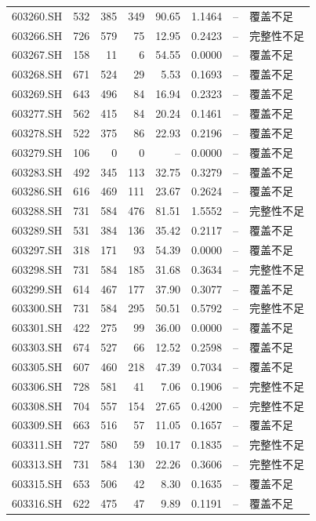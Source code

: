 \documentclass[10pt,a4paper]{article}
\begin{document}
\begin{longtable}{lrrr r r r l}
603260.SH & 532 & 385 & 349 & 90.65 & 1.1464 & -- & 覆盖不足\\
603266.SH & 726 & 579 & 75 & 12.95 & 0.2423 & -- & 完整性不足\\
603267.SH & 158 & 11 & 6 & 54.55 & 0.0000 & -- & 覆盖不足\\
603268.SH & 671 & 524 & 29 & 5.53 & 0.1693 & -- & 覆盖不足\\
603269.SH & 643 & 496 & 84 & 16.94 & 0.2323 & -- & 覆盖不足\\
603277.SH & 562 & 415 & 84 & 20.24 & 0.1461 & -- & 覆盖不足\\
603278.SH & 522 & 375 & 86 & 22.93 & 0.2196 & -- & 覆盖不足\\
603279.SH & 106 & 0 & 0 & -- & 0.0000 & -- & 覆盖不足\\
603283.SH & 492 & 345 & 113 & 32.75 & 0.3279 & -- & 覆盖不足\\
603286.SH & 616 & 469 & 111 & 23.67 & 0.2624 & -- & 覆盖不足\\
603288.SH & 731 & 584 & 476 & 81.51 & 1.5552 & -- & 完整性不足\\
603289.SH & 531 & 384 & 136 & 35.42 & 0.2117 & -- & 覆盖不足\\
603297.SH & 318 & 171 & 93 & 54.39 & 0.0000 & -- & 覆盖不足\\
603298.SH & 731 & 584 & 185 & 31.68 & 0.3634 & -- & 完整性不足\\
603299.SH & 614 & 467 & 177 & 37.90 & 0.3077 & -- & 覆盖不足\\
603300.SH & 731 & 584 & 295 & 50.51 & 0.5792 & -- & 完整性不足\\
603301.SH & 422 & 275 & 99 & 36.00 & 0.0000 & -- & 覆盖不足\\
603303.SH & 674 & 527 & 66 & 12.52 & 0.2598 & -- & 覆盖不足\\
603305.SH & 607 & 460 & 218 & 47.39 & 0.7034 & -- & 覆盖不足\\
603306.SH & 728 & 581 & 41 & 7.06 & 0.1906 & -- & 完整性不足\\
603308.SH & 704 & 557 & 154 & 27.65 & 0.4200 & -- & 完整性不足\\
603309.SH & 663 & 516 & 57 & 11.05 & 0.1657 & -- & 覆盖不足\\
603311.SH & 727 & 580 & 59 & 10.17 & 0.1835 & -- & 完整性不足\\
603313.SH & 731 & 584 & 130 & 22.26 & 0.3606 & -- & 完整性不足\\
603315.SH & 653 & 506 & 42 & 8.30 & 0.1635 & -- & 覆盖不足\\
603316.SH & 622 & 475 & 47 & 9.89 & 0.1191 & -- & 覆盖不足\\

\end{longtable}
\end{document}
